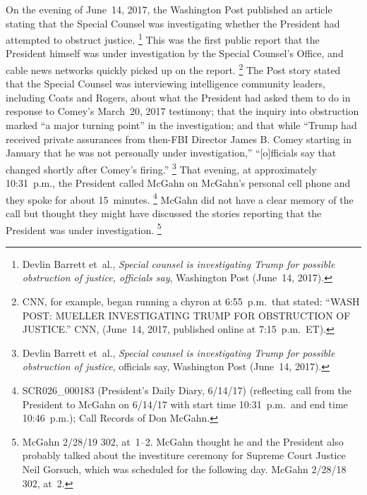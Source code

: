 On the evening of June~14, 2017, the Washington Post published an article stating that the Special Counsel was investigating whether the President had attempted to obstruct justice.%
\footnote{Devlin Barrett et~al., \textit{Special counsel is investigating Trump for possible obstruction of justice, officials say}, Washington Post (June~14, 2017).}
This was the first public report that the President himself was under investigation by the Special Counsel's Office, and cable news networks quickly picked up on the report.%
\footnote{CNN, for example, began running a chyron at 6:55~p.m.\ that stated: ``WASH POST: MUELLER INVESTIGATING TRUMP FOR OBSTRUCTION OF JUSTICE.'' CNN, (June~14, 2017, published online at 7:15~p.m.~ET).}
The Post story stated that the Special Counsel was interviewing intelligence community leaders, including Coats and Rogers, about what the President had asked them to do in response to Comey's March~20, 2017 testimony;
that the inquiry into obstruction marked ``a major turning point'' in the investigation;
and that while ``Trump had received private assurances from then-FBI Director James B. Comey starting in January that he was not personally under investigation,'' ``[o]fficials say that changed shortly after Comey's firing.''%
\footnote{Devlin Barrett et~al., \textit{Special counsel is investigating Trump for possible obstruction of justice}, officials say, Washington Post (June~14, 2017).}
That evening, at approximately 10:31~p.m., the President called McGahn on McGahn's personal cell phone and they spoke for about 15~minutes.%
\footnote{SCR026\_000183 (President's Daily Diary, 6/14/17) (reflecting call from the President to McGahn on 6/14/17 with start time 10:31~p.m.\ and end time 10:46~p.m.);
Call Records of Don McGahn.}
McGahn did not have a clear memory of the call but thought they might have discussed the stories reporting that the President was under investigation.%
\footnote{McGahn 2/28/19 302, at~1--2.
McGahn thought he and the President also probably talked about the investiture ceremony for Supreme Court Justice Neil Gorsuch, which was scheduled for the following day.
McGahn 2/28/18 302, at~2.}

